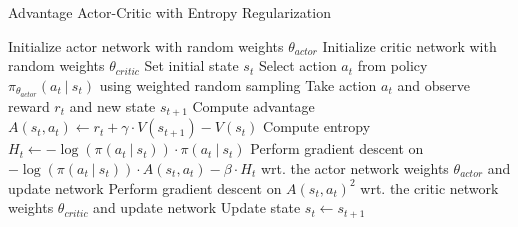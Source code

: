 \begin{algorithm}[H]
  \caption[Advantage Actor-Critic]{Advantage Actor-Critic with Entropy Regularization}
  \label{alg:advantage_actor_critic}
  \begin{algorithmic}
    \State Initialize actor network with random weights $\theta_{actor}$
    \State Initialize critic network with random weights $\theta_{critic}$
    \State Set initial state $s_t$
    \State Select action $a_t$ from policy $\pi_{\theta_{actor}}(a_t~|~s_t)$ using weighted random sampling
    \State Take action $a_t$ and observe reward $r_t$ and new state $s_{t+1}$
    \State Compute advantage $A(s_t, a_t) \gets r_t+\gamma\cdot V(s_{t+1}) - V(s_t)$
    \State Compute entropy $H_t\gets-\log(\pi(a_t~|~s_t)) \cdot \pi(a_t~|~s_t)$
    \State Perform gradient descent on $-\log (\pi(a_t~|~s_t)) \cdot A(s_t, a_t) - \beta\cdot H_t$
    \State \hspace{1cm} wrt. the actor network weights $\theta_{actor}$ and update network
    \State Perform gradient descent on $A(s_t, a_t)^2$
    \State \hspace{1cm} wrt. the critic network weights $\theta_{critic}$ and update network
    \State Update state $s_t \gets s_{t+1}$
    \EndWhile
    \EndFor
  \end{algorithmic}
\end{algorithm}
